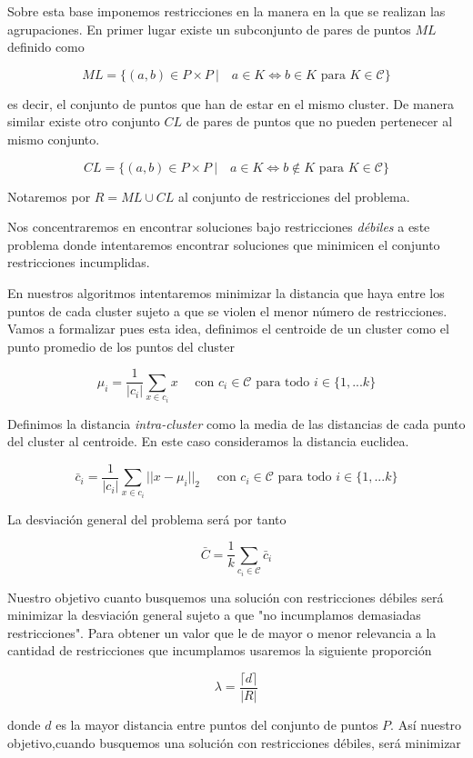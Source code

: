 \documentclass[11pt]{article}
\begin{document}
Sobre esta base imponemos restricciones en la manera en la que se
realizan las agrupaciones. En primer lugar existe un subconjunto de
pares de puntos $ML$ definido como

\[ ML = \{(a,b) \in P\times P\ | \quad a \in K \iff b\in K \text{ para } K \in \mathcal{C}\}\]

es decir, el conjunto de puntos que han de estar en el mismo
cluster. De manera similar existe otro conjunto $CL$ de pares de
puntos que no pueden pertenecer al mismo conjunto.

\[ CL = \{(a,b) \in P\times P\ | \quad a \in K \iff b\notin K \text{ para } K \in \mathcal{C}\}\]

Notaremos por $R = ML \cup CL$ al conjunto de restricciones del problema.

Nos concentraremos en encontrar soluciones bajo restricciones \textit{débiles} a
este problema donde intentaremos encontrar soluciones que minimicen el conjunto
restricciones incumplidas.

En nuestros algoritmos intentaremos minimizar la distancia que haya
entre los puntos de cada cluster sujeto a que se violen el menor
número de restricciones. Vamos a formalizar pues esta idea,
definimos el centroide de un cluster como el punto promedio de los
puntos del cluster

\[
  \mu_i = \frac{1}{|c_i|}\sum_{x\in c_i}x \quad \text{ con } c_i \in \mathcal{C} \text{ para todo } i \in \{1,...k\}
\]

Definimos la distancia \textit{intra-cluster} como la media de las
distancias de cada punto del cluster al centroide. En este caso
consideramos la distancia euclidea.

\[
  \bar c_i = \frac{1}{|c_i|}\sum_{x\in c_i}||x-\mu_i||_2 \quad \text{ con } c_i \in \mathcal{C} \text{ para todo } i \in \{1,...k\}
\]

La desviación general del problema será por tanto

\[
  \bar C = \frac{1}{k}\sum_{c_i\in \mathcal{C}}\bar c_i
\]

Nuestro objetivo cuanto busquemos una solución con restricciones
débiles será minimizar la desviación general sujeto a que "no
incumplamos demasiadas restricciones". Para obtener un valor que le de
mayor o menor relevancia a la cantidad de restricciones que
incumplamos usaremos la siguiente proporción

\[
  \lambda = \frac{\lceil d \rceil}{|R|}
\]

donde $d$ es la mayor distancia entre puntos del conjunto de puntos
$P$.  Así nuestro objetivo,cuando busquemos una solución con
restricciones débiles, será minimizar
\end{document}
